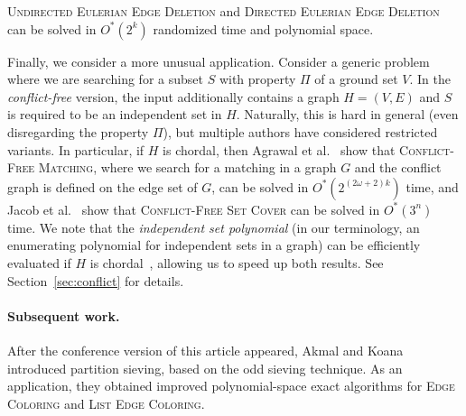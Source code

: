 \documentclass{theoretics}
\begin{document}
\begin{theorem} \label{ithm:euler}
  \textsc{Undirected Eulerian Edge Deletion} and \textsc{Directed
    Eulerian Edge Deletion} can be solved in $O^*(2^k)$ randomized time and
  polynomial space.
\end{theorem}

Finally, we consider a more unusual application. Consider a generic
problem where we are searching for a subset $S$ with property $\Pi$ of a ground set $V$.
In the \emph{conflict-free} version, the input additionally contains a graph $H=(V,E)$
and $S$ is required to be an independent set in $H$. Naturally,
this is hard in general (even disregarding the property $\Pi$),
but multiple authors have considered restricted variants. 
In particular, if $H$ is chordal, then 
Agrawal et al.~\cite{AgrawalJKS20} show that \textsc{Conflict-Free Matching}, where we search for a matching in a graph $G$ and the conflict graph is defined on the edge set of $G$,
can be solved in $O^*(2^{(2\omega + 2)k})$ time, and 
Jacob et al.~\cite{JacobMR21} show that \textsc{Conflict-Free Set Cover}
can be solved in $O^*(3^n)$ time.
We note that the \emph{independent set polynomial} (in our
terminology, an enumerating polynomial for independent sets in a graph)
can be efficiently evaluated if $H$ is chordal~\cite{AchlioptasZ21},
allowing us to speed up both results. See Section~\ref{sec:conflict} for details.

\paragraph{Subsequent work.} After the conference version of this article appeared, Akmal and Koana~\cite{AkmalK25} introduced partition sieving, based on the odd sieving technique. As an application, they obtained improved polynomial-space exact algorithms for \textsc{Edge Coloring} and \textsc{List Edge Coloring}.
\end{document}
